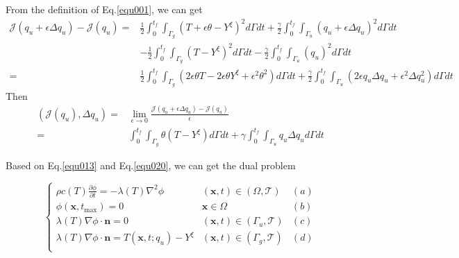 \documentclass[UTF-8]{article}
\begin{document}
From the definition of Eq.\ref{equ001}, we can get
\begin{align}
	\mathcal{J}(q_u + \epsilon \Delta q_u) - \mathcal{J}(q_u) = &\frac{1}{2} \int_{0}^{t_f} \int_{\Gamma_g} \left(T + \epsilon \theta - Y^\xi \right)^2 d\Gamma dt + \frac{\gamma}{2} \int_{0}^{t_f}\int_{\Gamma_u} \left(q_u + \epsilon \Delta q_u \right)^2 d\Gamma dt \nonumber \\
	&- \frac{1}{2} \int_{0}^{t_f} \int_{\Gamma_g} \left(T - Y^\xi \right)^2 d\Gamma dt - \frac{\gamma}{2} \int_{0}^{t_f}\int_{\Gamma_u} \left( q_u \right)^2 d\Gamma dt \nonumber \\
	=& \frac{1}{2} \int_{0}^{t_f} \int_{\Gamma_g} \left( 2 \epsilon \theta T - 2 \epsilon \theta Y^\xi + \epsilon^2 \theta^2  \right) d\Gamma dt + \frac{\gamma}{2} \int_{0}^{t_f} \int_{\Gamma_u} \left( 2\epsilon q_u \Delta q_u + \epsilon^2 \Delta q_u^2 \right)d \Gamma dt \nonumber 
\end{align}
Then
\begin{align}\label{equ013}
	\left(\mathcal{J}(q_u),\Delta q_u \right) =& \lim_{\epsilon \to 0} \frac{\mathcal{J}(q_u + \epsilon \Delta q_u) - \mathcal{J}(q_u)}{\epsilon} \nonumber \\
	=& \int_{0}^{t_f} \int_{\Gamma_g} \theta \left( T - Y^\xi \right) d\Gamma dt + \gamma \int_{0}^{t_f} \int_{\Gamma_u} q_u \Delta q_u d\Gamma dt
\end{align}

Based on Eq.\ref{equ013} and Eq.\ref{equ020}, we can get the dual problem

\begin{equation}\label{equ008}
	\left\{
	\begin{array}{lll}
		\rho c(T) \frac{\partial \phi}{\partial t} = -\lambda(T) \nabla^2 \phi \quad &(\pmb{x},t) \in (\Omega,\mathcal{T}) &(a) \\
		\phi(\pmb{x},t_{\text{max}}) = 0 &\pmb{x} \in \Omega &(b)\\
		\lambda(T) \nabla\phi \cdot \pmb{n} = 0 &(\pmb{x},t) \in (\Gamma_u, \mathcal{T}) &(c)\\
		\lambda(T) \nabla\phi \cdot \pmb{n} = T(\pmb{x},t;q_u) - Y^\xi &(\pmb{x},t) \in (\Gamma_g, \mathcal{T}) &(d)\\
	\end{array}
	\right.
\end{equation}
\end{document}
